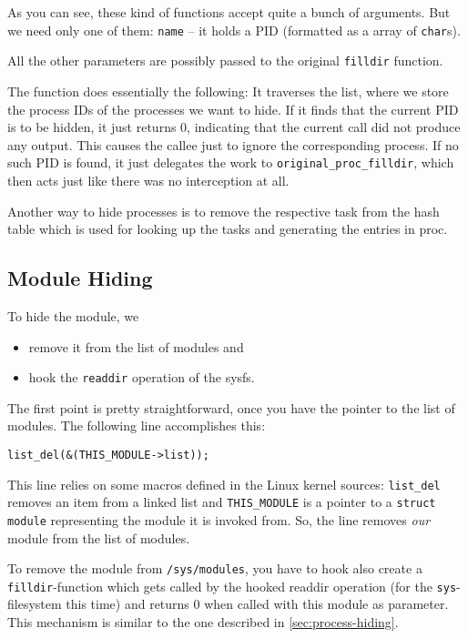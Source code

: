 \documentclass[10pt, letterpaper]{article}
\begin{document}
As you can see, these kind of functions accept quite a bunch of arguments. But we need only one of them: \texttt{name} -- it holds a PID (formatted as a array of \texttt{char}s). 

All the other parameters are possibly passed to the original \texttt{filldir} function.

The function does essentially the following: It traverses the list, where we store the process IDs of the processes we want to hide. If it finds that the current PID is to be hidden, it just returns 0, indicating that the current call did not produce any output. This causes the callee just to ignore the corresponding process. If no such PID is found, it just delegates the work to \texttt{original\_proc\_filldir}, which then acts just like there was no interception at all.

Another way to hide processes is to remove the respective task from the hash table which is used for looking up the tasks and generating the entries in proc.

\subsection{Module Hiding}
To hide the module, we 
\begin{itemize}
 \item remove it from the list of modules and
 \item hook the \texttt{readdir} operation of the sysfs.
\end{itemize}

The first point is pretty straightforward, once you have the pointer to the list of modules. The following line accomplishes this:

\begin{verbatim}
list_del(&(THIS_MODULE->list));
\end{verbatim}

This line relies on some macros defined in the Linux kernel sources: \texttt{list\_del} removes an item from a linked list and \texttt{THIS\_MODULE} is a pointer to a \texttt{struct module} representing the module it is invoked from. So, the line removes \emph{our} module from the list of modules.

To remove the module from \texttt{/sys/modules}, you have to hook also create a \texttt{filldir}-function which gets called by the hooked readdir operation (for the \texttt{sys}-filesystem this time) and returns 0 when called with this module as parameter. This mechanism is similar to the one described in \autoref{sec:process-hiding}.
\end{document}
